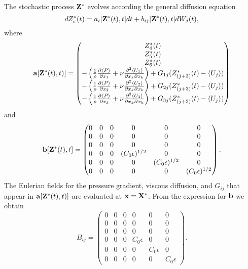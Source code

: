 \documentclass[oneside,a4paper,11pt]{report}
\begin{document}
The stochastic process $\bold{Z}^*$ evolves according the general diffusion equation
\begin{equation}
dZ^*_i(t) = a_i[\bold{Z}^*(t),t] dt + b_{ij}[\bold{Z}^*(t),t] dW_j(t),
\end{equation}
where 
\begin{equation}
\bold{a}[\bold{Z}^*(t),t)] =  \begin{pmatrix}
  Z^*_4(t) \\
  Z^*_5(t)  \\
  Z^*_6(t) \\
-\left ( \frac{1}{\rho} \frac{\partial \langle P \rangle}{\partial x_1} + \nu \frac{\partial^2 \langle U_1 \rangle}{\partial x_k \partial x_k} \right ) + G_{1j} (Z_{(j+3)}^*(t) - \langle U_j \rangle) \\
-\left ( \frac{1}{\rho} \frac{\partial \langle P \rangle}{\partial x_2} + \nu \frac{\partial^2 \langle U_2 \rangle}{\partial x_k \partial x_k} \right ) + G_{2j} (Z_{(j+3)}^*(t) - \langle U_j \rangle) \\
-\left ( \frac{1}{\rho} \frac{\partial \langle P \rangle}{\partial x_3} + \nu \frac{\partial^2 \langle U_3 \rangle}{\partial x_k \partial x_k} \right ) + G_{3j} (Z_{(j+3)}^*(t) - \langle U_j \rangle)
 \end{pmatrix}
\end{equation}
and
\begin{equation}
\mathbf{b}[\bold{Z}^*(t),t] = \begin{pmatrix}
  0 & 0 & 0 & 0 & 0 & 0 \\
  0 & 0 & 0 & 0 & 0 & 0 \\
  0 & 0 & 0 & 0 & 0 & 0 \\
  0 & 0 & 0 & (C_0 \epsilon)^{1/2}  & 0 & 0 \\
  0 & 0 & 0 & 0 & (C_0 \epsilon)^{1/2}  & 0 \\
  0 & 0 & 0 & 0 & 0 & (C_0 \epsilon)^{1/2} 
 \end{pmatrix}.
\end{equation}
The Eulerian fields for the pressure gradient, viscous diffusion, and $G_{ij}$ that appear in $\mathbf{a}[\mathbf{Z}^*(t),t)]$ are evaluated at $\mathbf{x} = \mathbf{X}^*$. From the expression for $\mathbf{b}$ we obtain
\begin{equation}
B_{ij} = \begin{pmatrix}
  0 & 0 & 0 & 0 & 0 & 0 \\
  0 & 0 & 0 & 0 & 0 & 0 \\
  0 & 0 & 0 & 0 & 0 & 0 \\
  0 & 0 & 0 & C_0 \epsilon  & 0 & 0 \\
  0 & 0 & 0 & 0 & C_0 \epsilon  & 0 \\
  0 & 0 & 0 & 0 & 0 & C_0 \epsilon
 \end{pmatrix}.
\end{equation}
\end{document}
